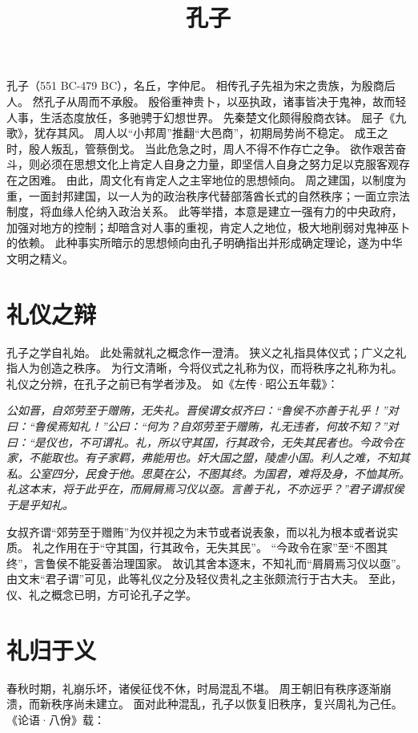 \documentclass[11pt]{article}
\title{孔子}
\date{}
\begin{document}
  \maketitle
  
  \linenumbers


孔子（551 BC-479 BC），名丘，字仲尼。
相传孔子先祖为宋之贵族，为殷商后人。
然孔子从周而不承殷。
殷俗重神贵卜，以巫执政，诸事皆决于鬼神，故而轻人事，生活态度放任，多驰骋于幻想世界。
先秦楚文化颇得殷商衣钵。
屈子《九歌》，犹存其风。
周人以“小邦周”推翻“大邑商”，初期局势尚不稳定。
成王之时，殷人叛乱，管蔡倒戈。
当此危急之时，周人不得不作存亡之争。
欲作艰苦奋斗，则必须在思想文化上肯定人自身之力量，即坚信人自身之努力足以克服客观存在之困难。
由此，周文化有肯定人之主宰地位的思想倾向。
周之建国，以制度为重，一面封邦建国，以一人为的政治秩序代替部落酋长式的自然秩序；一面立宗法制度，将血缘人伦纳入政治关系。
此等举措，本意是建立一强有力的中央政府，加强对地方的控制；却暗含对人事的重视，肯定人之地位，极大地削弱对鬼神巫卜的依赖。
此种事实所暗示的思想倾向由孔子明确指出并形成确定理论，遂为中华文明之精义。

\newline

\section{礼仪之辩}
孔子之学自礼始。
此处需就礼之概念作一澄清。
狭义之礼指具体仪式；广义之礼指人为创造之秩序。
为行文清晰，今将仪式之礼称为仪，而将秩序之礼称为礼。
礼仪之分辨，在孔子之前已有学者涉及。
如《左传·昭公五年载》：

\textit{公如晋，自郊劳至于赠贿，无失礼。晋侯谓女叔齐曰：“鲁侯不亦善于礼乎！”对曰：“鲁侯焉知礼！”公曰：“何为？自郊劳至于赠贿，礼无违者，何故不知？”对曰：“是仪也，不可谓礼。礼，所以守其国，行其政令，无失其民者也。今政令在家，不能取也。有子家羁，弗能用也。奸大国之盟，陵虐小国。利人之难，不知其私。公室四分，民食于他。思莫在公，不图其终。为国君，难将及身，不恤其所。礼这本末，将于此乎在，而屑屑焉习仪以亟。言善于礼，不亦远乎？”君子谓叔侯于是乎知礼。}

女叔齐谓“郊劳至于赠贿”为仪并视之为末节或者说表象，而以礼为根本或者说实质。
礼之作用在于“守其国，行其政令，无失其民”。
“今政令在家”至“不图其终”，言鲁侯不能妥善治理国家。
故讥其舍本逐末，不知礼而“屑屑焉习仪以亟”。
由文末“君子谓”可见，此等礼仪之分及轻仪贵礼之主张颇流行于古大夫。
至此，仪、礼之概念已明，方可论孔子之学。

\newline

\section{礼归于义}
春秋时期，礼崩乐坏，诸侯征伐不休，时局混乱不堪。
周王朝旧有秩序逐渐崩溃，而新秩序尚未建立。
面对此种混乱，孔子以恢复旧秩序，复兴周礼为己任。
《论语·八佾》载：
\end{document}
